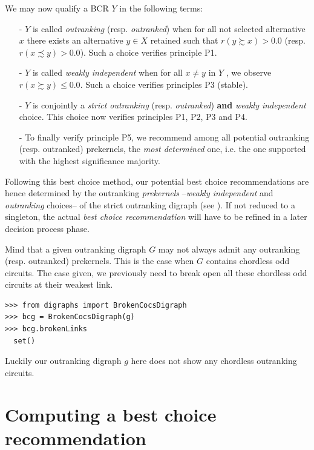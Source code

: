 We may now qualify a BCR $Y$ in the following terms:
\begin{itemize}[leftmargin=0.5cm,listparindent=0em]
\item [-] $Y$ is called \emph{outranking} (resp. \emph{outranked}) when for all not selected alternative $x$ there exists an alternative $y \in X$ retained such that $r(y \succsim x) > 0.0$ (resp. $r(x \precsim y) > 0.0$). Such a choice verifies principle P1.
\item [-] $Y$ is called \emph{weakly independent} when for all $x \neq y$ in $Y$ , we observe $r(x \succsim y) \leq 0.0$. Such a choice verifies principles P3 (stable).
\item [-] $Y$ is conjointly a \emph{strict  outranking} (resp. \emph{outranked}) \textbf{and} \emph{weakly independent} choice. This choice now verifies principles P1, P2, P3 and P4.
\item [-] To finally verify principle P5, we recommend among all potential outranking (resp. outranked) prekernels, the \emph{most determined} one, i.e. the one supported with the highest significance majority.
\end{itemize}

Following this best choice method, our potential best choice recommendations are hence determined by the outranking \emph{prekernels} --\emph{weakly independent} and \emph{outranking} choices-- of the strict outranking digraph (see \citet{BIS-2008a}). If not reduced to a singleton, the actual \emph{best choice recommendation} will have to be refined in a later decision process phase.

Mind that a given outranking digraph $G$ may not always admit any outranking (resp. outranked) prekernels. This is the case when $G$ contains chordless odd circuits. The case given, we previously need to break open all these chordless odd circuits at their weakest link.
\begin{lstlisting}
>>> from digraphs import BrokenCocsDigraph
>>> bcg = BrokenCocsDigraph(g)
>>> bcg.brokenLinks
  set()
\end{lstlisting}
Luckily our outranking digraph $g$ here does not show any chordless outranking circuits.

\section{Computing a best choice recommendation}
\label{sec:4.4}

